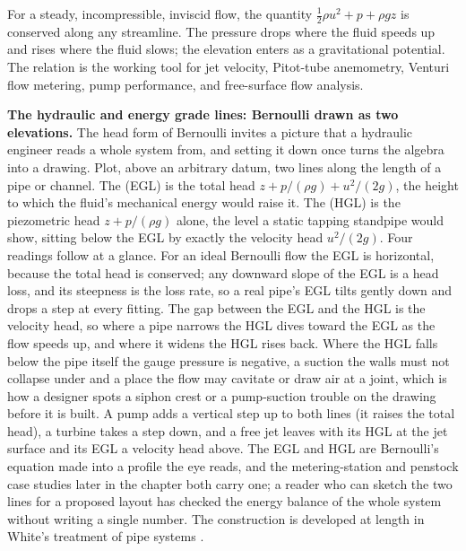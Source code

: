 \begin{principle}
For a steady, incompressible, inviscid flow, the quantity
$\tfrac{1}{2}\rho u^2 + p + \rho g z$ is conserved along any
streamline. The pressure drops where the fluid speeds up and rises
where the fluid slows; the elevation enters as a gravitational
potential. The relation is the working tool for jet velocity,
Pitot-tube anemometry, Venturi flow metering, pump performance, and
free-surface flow analysis.
\end{principle}

\begin{mastery}
\textbf{The hydraulic and energy grade lines: Bernoulli drawn as two
elevations.} The head form of Bernoulli invites a picture that a
hydraulic engineer reads a whole system from, and setting it down once
turns the algebra into a drawing. Plot, above an arbitrary datum, two
lines along the length of a pipe or channel. The  (EGL) is the total head $z + p/(\rho g) + u^2/(2g)$, the height to
which the fluid's mechanical energy would raise it. The  (HGL) is the piezometric head $z + p/(\rho g)$
alone, the level a static tapping standpipe would show, sitting below
the EGL by exactly the velocity head $u^2/(2g)$. Four readings follow
at a glance. For an ideal Bernoulli flow the EGL is horizontal, because
the total head is conserved; any downward slope of the EGL is a head
loss, and its steepness is the loss rate, so a real pipe's EGL tilts
gently down and drops a step at every fitting. The gap between the EGL
and the HGL is the velocity head, so where a pipe narrows the HGL dives
toward the EGL as the flow speeds up, and where it widens the HGL rises
back. Where the HGL falls below the pipe itself the gauge pressure is
negative, a suction the walls must not collapse under and a place the
flow may cavitate or draw air at a joint, which is how a designer spots
a siphon crest or a pump-suction trouble on the drawing before it is
built. A pump adds a vertical step up to both lines (it raises the total
head), a turbine takes a step down, and a free jet leaves with its HGL
at the jet surface and its EGL a velocity head above. The EGL and HGL
are Bernoulli's equation made into a profile the eye reads, and the
metering-station and penstock case studies later in the chapter both
carry one; a reader who can sketch the two lines for a proposed layout
has checked the energy balance of the whole system without writing a
single number. The construction is developed at length in White's
treatment of pipe systems
\cite[chap.~6]{text:white-fluid-mechanics}.
\end{mastery}

